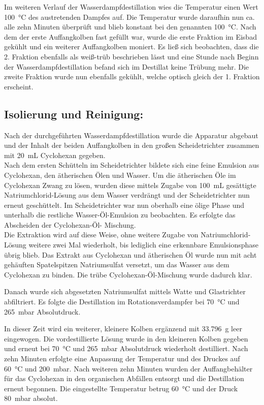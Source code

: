 Im weiteren Verlauf der Wasserdampfdestillation wies die Temperatur einen Wert \SI{100}{\celsius} des austretenden Dampfes auf.
Die Temperatur wurde daraufhin nun ca. alle zehn Minuten überprüft und blieb konstant bei den genannten  \SI{100}{\celsius}.
Nach dem der erste Auffangkolben fast gefüllt war, wurde die erste Fraktion im Eisbad gekühlt und ein weiterer Auffangkolben moniert.
Es ließ sich beobachten, dass die 2. Fraktion ebenfalls als weiß-trüb beschrieben lässt und eine Stunde nach Beginn der Wasserdampfdestillation befand sich im Destillat keine Trübung mehr. Die zweite Fraktion wurde nun ebenfalls gekühlt, welche optisch gleich der 1. Fraktion erscheint.

\subsection*{Isolierung und Reinigung:}
Nach der durchgeführten Wasserdampfdestillation wurde die Apparatur abgebaut und der Inhalt der beiden Auffangkolben in den großen Scheidetrichter zusammen mit \SI{20}{\milli \liter} Cyclohexan gegeben.\\
Nach dem ersten Schütteln im Scheidetrichter bildete sich eine feine Emulsion aus Cyclohexan, den ätherischen Ölen und Wasser.
Um die ätherischen Öle im Cyclohexan Zwang zu lösen, wurden diese mittels Zugabe von \SI{100}{\milli \liter} gesättigte Natriumchlorid-Lösung aus dem Wasser verdrängt und der Scheidetrichter nun erneut geschüttelt.
Im Scheidetrichter war nun oberhalb eine ölige Phase und unterhalb die restliche Wasser-Öl-Emulsion zu beobachten. Es erfolgte das Abscheiden der Cyclohexan-Öl- Mischung.\\

Die Extraktion wird auf diese Weise, ohne weitere Zugabe von Natriumchlorid-Lösung weitere zwei Mal wiederholt, bis lediglich eine erkennbare Emulsionsphase übrig blieb.
Das Extrakt aus Cyclohexan und ätherischen Öl wurde nun mit acht gehäuften Spatelspitzen Natriumsulfat versetzt, um das Wasser aus dem Cyclohexan zu binden. Die trübe Cyclohexan-Öl-Mischung wurde dadurch klar. 

Danach wurde sich abgesetzten Natriumsulfat mittels Watte und Glastrichter abfiltriert. Es folgte die Destillation im Rotationsverdampfer bei \SI{70}{\celsius} und \SI{265}{\milli \bar} Absolutdruck.

In dieser Zeit wird ein weiterer, kleinere Kolben ergänzend mit \SI{33,796}{\gram} leer eingewogen.
Die vordestillierte Lösung wurde in den kleineren Kolben gegeben und erneut bei \SI{70}{\celsius} und \SI{265}{\milli \bar} Absolutdruck wiederholt destilliert.
Nach zehn Minuten erfolgte eine Anpassung der Temperatur und  des Druckes auf \SI{60}{\celsius} und \SI{200}{\milli \bar}.
Nach weiteren zehn Minuten wurden der Auffangbehälter für das Cyclohexan in den organischen Abfällen entsorgt und die Destillation erneut begonnen. Die eingestellte Temperatur betrug \SI{60}{\celsius} und der Druck \SI{80}{\milli \bar} absolut.\\


